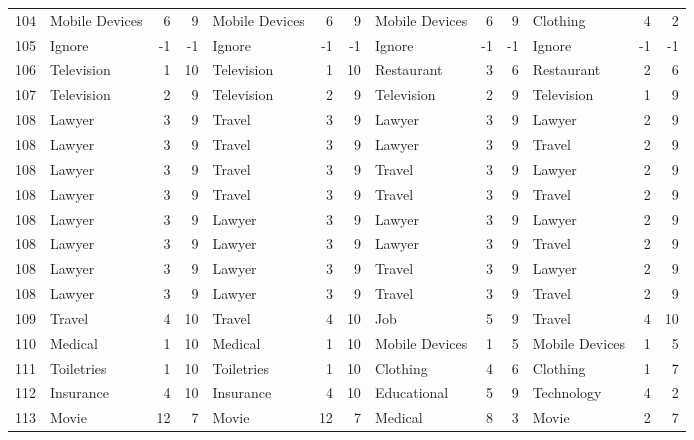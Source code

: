 \begin{figure}[htbp]
\begin{tabular}{rlrrlrrlrrlrr}
    104   & Mobile Devices & 6     & 9     & Mobile Devices & 6     & 9     & Mobile Devices & 6     & 9     & Clothing & 4     & 2 \\
    105   & Ignore & -1    & -1    & Ignore & -1    & -1    & Ignore & -1    & -1    & Ignore & -1    & -1 \\
    106   & Television & 1     & 10    & Television & 1     & 10    & Restaurant & 3     & 6     & Restaurant & 2     & 6 \\
    107   & Television & 2     & 9     & Television & 2     & 9     & Television & 2     & 9     & Television & 1     & 9 \\
    108   & Lawyer & 3     & 9     & Travel & 3     & 9     & Lawyer & 3     & 9     & Lawyer & 2     & 9 \\
    108   & Lawyer & 3     & 9     & Travel & 3     & 9     & Lawyer & 3     & 9     & Travel & 2     & 9 \\
    108   & Lawyer & 3     & 9     & Travel & 3     & 9     & Travel & 3     & 9     & Lawyer & 2     & 9 \\
    108   & Lawyer & 3     & 9     & Travel & 3     & 9     & Travel & 3     & 9     & Travel & 2     & 9 \\
    108   & Lawyer & 3     & 9     & Lawyer & 3     & 9     & Lawyer & 3     & 9     & Lawyer & 2     & 9 \\
    108   & Lawyer & 3     & 9     & Lawyer & 3     & 9     & Lawyer & 3     & 9     & Travel & 2     & 9 \\
    108   & Lawyer & 3     & 9     & Lawyer & 3     & 9     & Travel & 3     & 9     & Lawyer & 2     & 9 \\
    108   & Lawyer & 3     & 9     & Lawyer & 3     & 9     & Travel & 3     & 9     & Travel & 2     & 9 \\
    109   & Travel & 4     & 10    & Travel & 4     & 10    & Job   & 5     & 9     & Travel & 4     & 10 \\
    110   & Medical & 1     & 10    & Medical & 1     & 10    & Mobile Devices & 1     & 5     & Mobile Devices & 1     & 5 \\
    111   & Toiletries & 1     & 10    & Toiletries & 1     & 10    & Clothing & 4     & 6     & Clothing & 1     & 7 \\
    112   & Insurance & 4     & 10    & Insurance & 4     & 10    & Educational & 5     & 9     & Technology & 4     & 2 \\
    113   & Movie & 12    & 7     & Movie & 12    & 7     & Medical & 8     & 3     & Movie & 2     & 7 \\

\end{tabular}
\end{figure}
